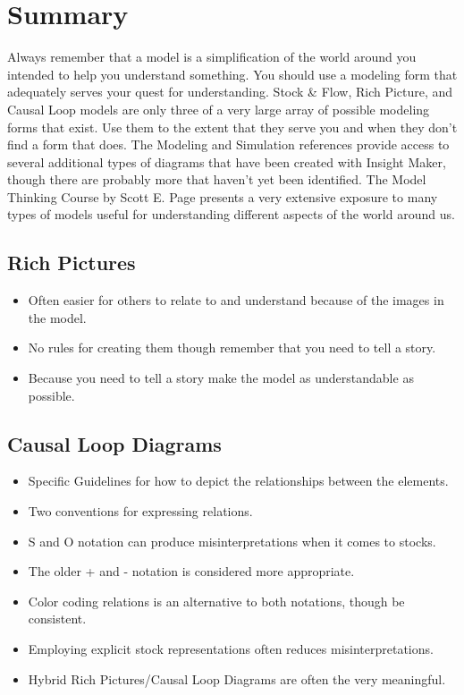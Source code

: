 \documentclass[]{memoir}
\begin{document}
\section{Summary}

Always remember that a model is a simplification of the world around you
intended to help you understand something. You should use a modeling
form that adequately serves your quest for understanding. Stock \& Flow,
Rich Picture, and Causal Loop models are only three of a very large
array of possible modeling forms that exist. Use them to the extent that
they serve you and when they don't find a form that does. The Modeling
and Simulation references provide access to several additional types of
diagrams that have been created with Insight Maker, though there are
probably more that haven't yet been identified. The Model Thinking
Course by Scott E. Page presents a very extensive exposure to many types
of models useful for understanding different aspects of the world around
us.

\subsection{Rich Pictures}

\begin{itemize}
\itemsep1pt\parskip0pt
\item
  Often easier for others to relate to and understand because of the
  images in the model.
\item
  No rules for creating them though remember that you need to tell a
  story.
\item
  Because you need to tell a story make the model as understandable as
  possible.
\end{itemize}

\subsection{Causal Loop Diagrams}

\begin{itemize}
\itemsep1pt\parskip0pt
\item
  Specific Guidelines for how to depict the relationships between the
  elements.
\item
  Two conventions for expressing relations.
\item
  S and O notation can produce misinterpretations when it comes to
  stocks.
\item
  The older + and - notation is considered more appropriate.
\item
  Color coding relations is an alternative to both notations, though be
  consistent.
\item
  Employing explicit stock representations often reduces
  misinterpretations.
\item
  Hybrid Rich Pictures/Causal Loop Diagrams are often the very
  meaningful.
\end{itemize}
\end{document}
